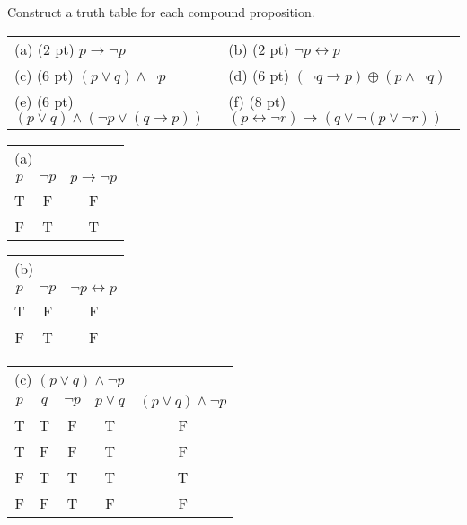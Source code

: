 \documentclass[11pt,addpoints]{exam}
\newcommand{\ra}{\rightarrow}
\newcommand{\lra}{\leftrightarrow}
\newcommand{\xor}{\oplus}
\begin{document}
\begin{questions}
\question[32]\label{tt} Construct a truth table for each compound proposition.
    \ifprintanswers
        \vspace{-10pt}
    \fi
    \footnotesize
    \begin{center}
    \begin{tabular}{ll}
       (a) (2 pt) $p \ra \neg p$  
       & (b) (2 pt) $\neg p \lra p$ \\
       (c) (6 pt) $(p \vee q) \wedge \neg p$ 
       & (d) (6 pt) $(\neg q \ra p) \xor (p \wedge \neg q)$ \\
       (e) (6 pt) $(p \vee q) \wedge (\neg p \vee (q \ra p))$ 
       & (f) (8 pt) $(p \lra \neg r) \ra (q \vee \neg (p \vee \neg r))$
    \end{tabular}
    \end{center}
    \normalsize
    \ifprintanswers
        \vspace{-15pt}
    \fi
    \begin{solution}
    \scriptsize
	   \begin{tabular}{c|c||c}
            \multicolumn{3}{l}{ (a) } \\
            $p$ & $\neg p$ & $p \ra \neg p$ \\
         \hline
            T & F & F \\
            F & T & T \\
         \end{tabular} \hspace{0.5in}
         \begin{tabular}{c|c||c}
            \multicolumn{3}{l}{ (b) } \\
            $p$ & $\neg p$ & $\neg p \lra p$ \\
         \hline
            T & F & F \\
            F & T & F \\
         \end{tabular} \hspace{0.5in}
        \begin{tabular}{c|c|c||c|c}
            \multicolumn{5}{l}{ (c)  $(p \vee q) \wedge \neg p$} \\
            $p$ & $q$ & $\neg p$ & $p \vee q$ & $(p \vee q) \wedge \neg p$ \\
         \hline
            T & T & F & T & F  \\
            T & F & F & T & F  \\
            F & T & T & T & T  \\
            F & F & T & F & F  \\
        \end{tabular} 


\end{solution}
\end{questions}
\end{document}
